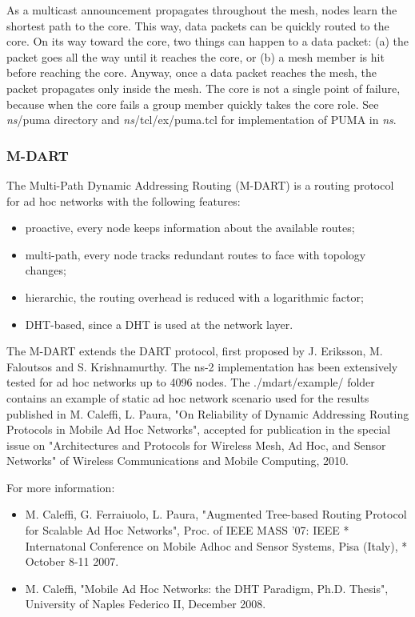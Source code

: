 As a multicast announcement propagates throughout the mesh, nodes learn the
shortest path to the core. This way, data packets can be quickly routed to 
the core. On its way toward the core, two things can happen to a data packet:
(a) the packet goes all the way until it reaches the core, or (b) a mesh 
member is hit before reaching the core. Anyway, once a data packet reaches 
the mesh, the packet propagates only inside the mesh. The core is not a 
single point of failure, because when the core fails a group member quickly 
takes the core role.
See \emph{ns}/puma directory and \emph{ns}/tcl/ex/puma.tcl for implementation of
PUMA in \emph{ns}.

\subsubsection{M-DART}
\label{sec:M-DART}

The Multi-Path Dynamic Addressing Routing (M-DART) is a routing protocol 
for ad hoc networks with the following features:
\begin{itemize}
\item proactive, every node keeps information about the available routes;
\item multi-path, every node tracks redundant routes to face with topology changes;
\item hierarchic, the routing overhead is reduced with a logarithmic factor;
\item DHT-based, since a DHT is used at the network layer.
\end{itemize}

The M-DART extends the DART protocol, first proposed by 
J. Eriksson, M. Faloutsos and S. Krishnamurthy.  The ns-2 
implementation has been extensively tested for ad hoc networks up to 
4096 nodes. The ./mdart/example/ folder contains an example of static 
ad hoc network scenario used for the results published in 
M. Caleffi, L. Paura, "On Reliability of Dynamic Addressing Routing 
Protocols in Mobile Ad Hoc Networks", accepted for publication in 
the special issue on "Architectures and Protocols for Wireless Mesh, Ad Hoc,
and Sensor Networks" of Wireless Communications and Mobile Computing, 2010.

For more information:
\begin{itemize}
\item M. Caleffi, G. Ferraiuolo, L. Paura, "Augmented Tree-based Routing  
Protocol for Scalable Ad Hoc Networks", Proc. of IEEE MASS '07: IEEE      *
Internatonal Conference on Mobile Adhoc and Sensor Systems, Pisa (Italy), *
October 8-11 2007. 
\item M. Caleffi, "Mobile Ad Hoc Networks: the DHT Paradigm, Ph.D. Thesis", 
University of Naples Federico II, December 2008. 
\end{itemize}

